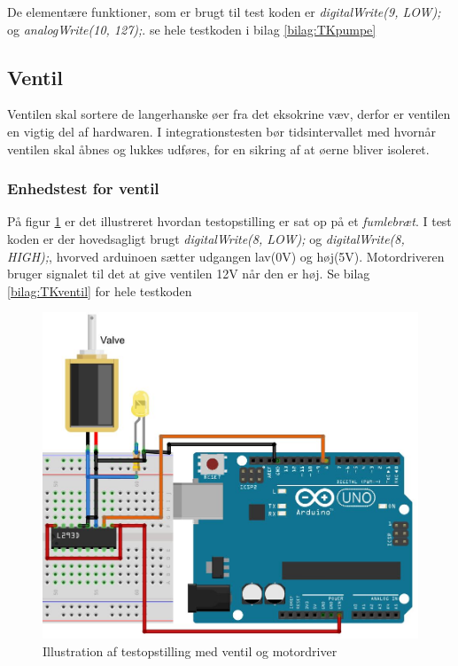 De elementære funktioner, som er brugt til test koden er \textit{digitalWrite(9, LOW);} og \textit{analogWrite(10, 127);}. se hele testkoden i bilag \ref{bilag:TKpumpe}

\newpage

 \subsection{Ventil}
Ventilen skal sortere de langerhanske øer fra det eksokrine væv, derfor er ventilen en vigtig del af hardwaren. I integrationstesten bør tidsintervallet med hvornår ventilen skal åbnes og lukkes udføres, for en sikring af at øerne bliver isoleret.
\subsubsection{Enhedstest for ventil}
På figur \ref{fig:ventilbreadboard} er det illustreret hvordan testopstilling er sat op på et \textit{fumlebræt}. I test koden er der hovedsagligt brugt \textit{digitalWrite(8, LOW);} og \textit{digitalWrite(8, HIGH);}, hvorved arduinoen sætter udgangen lav(0V) og høj(5V). Motordriveren bruger signalet til det at give ventilen 12V når den er høj. Se bilag \ref{bilag:TKventil} for hele testkoden

\begin{figure}[H]
	\centering
	\includegraphics[width=1\textwidth]{billeder/Hardware/diagrammer/Ventilbreadboard.JPG}
	\caption{Illustration af testopstilling med ventil og motordriver}
	\label{fig:ventilbreadboard}
\end{figure} 
 

